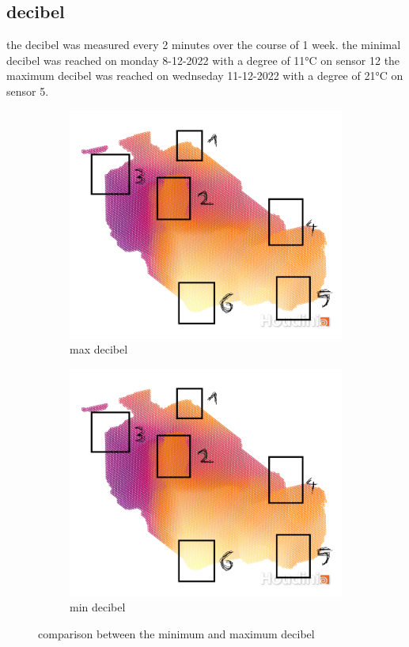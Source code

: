 \subsection{decibel} 
the decibel was measured every 2 minutes over the course of 1 week. the minimal decibel was reached on monday 8-12-2022 with a degree of 11°C on sensor 12 the maximum decibel was reached on wednseday 11-12-2022 with a degree of 21°C on sensor 5.\\ 
\begin{figure}[hbt!] 
   \begin{subfigure}{0.5\textwidth} 
        \includegraphics[width=0.99\linewidth]{reports/current_report/images/max_decibel.png}  
        \caption{max decibel}  
    \end{subfigure} 
    \begin{subfigure}{0.5\textwidth} 
       \includegraphics[width=0.99\linewidth]{reports/current_report/images/min_decibel.png}  
       \caption{min decibel}  
    \end{subfigure} 
\caption{comparison between the minimum and maximum  decibel}  
\end{figure} 
